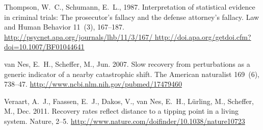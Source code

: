 \documentclass[authoryear,review,12pt]{elsarticle}
\begin{document}
\begin{thebibliography}{24}
Thompson, W.~C., Schumann, E.~L., 1987. {Interpretation of statistical evidence
  in criminal trials: The prosecutor's fallacy and the defense attorney's
  fallacy.} Law and Human Behavior 11~(3), 167--187.
\newline\urlprefix\url{http://psycnet.apa.org/journals/lhb/11/3/167/
  http://doi.apa.org/getdoi.cfm?doi=10.1007/BF01044641}

van Nes, E.~H., Scheffer, M., Jun. 2007. {Slow recovery from perturbations as a
  generic indicator of a nearby catastrophic shift.} The American naturalist
  169~(6), 738--47.
\newline\urlprefix\url{http://www.ncbi.nlm.nih.gov/pubmed/17479460}

Veraart, A.~J., Faassen, E.~J., Dakos, V., van Nes, E.~H., L\"{u}rling, M.,
  Scheffer, M., Dec. 2011. {Recovery rates reflect distance to a tipping point
  in a living system}. Nature, 2--5.
\newline\urlprefix\url{http://www.nature.com/doifinder/10.1038/nature10723}

\end{thebibliography}
 
 
\end{document}
